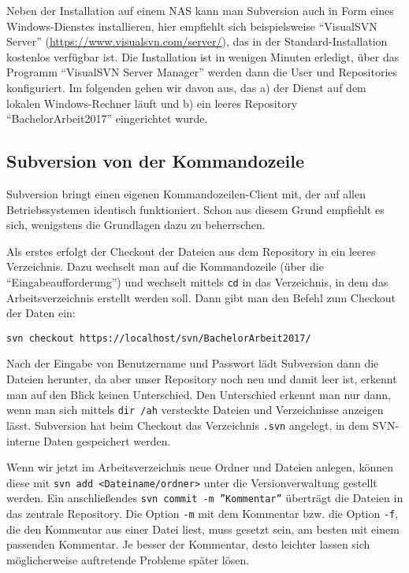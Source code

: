 Neben der Installation auf einem NAS kann man Subversion auch in Form eines Windows-Dienstes installieren, hier empfiehlt sich beispielsweise \enquote{VisualSVN Server} (\url{https://www.visualsvn.com/server/}), das in der Standard-Installation kostenlos verfügbar ist. Die Installation ist in wenigen Minuten erledigt, über das Programm \enquote{VisualSVN Server Manager} werden dann die User und Repositories konfiguriert. Im folgenden gehen wir davon aus, das a) der Dienst auf dem lokalen Windows-Rechner läuft und b) ein leeres Repository \enquote{BachelorArbeit2017} eingerichtet wurde.


\subsection{Subversion von der Kommandozeile}

Subversion bringt einen eigenen Kommandozeilen-Client mit, der auf allen Betriebssystemen identisch funktioniert. 
Schon aus diesem Grund empfiehlt es sich, wenigstens die Grundlagen dazu zu beherrschen.

Als erstes erfolgt der Checkout der Dateien aus dem Repository in ein leeres Verzeichnis. Dazu wechselt man auf die Kommandozeile (über die \enquote{Eingabeaufforderung}) und wechselt mittels \texttt{cd} in das Verzeichnis, in dem das Arbeitsverzeichnis erstellt werden soll. 
Dann gibt man den Befehl zum Checkout der Daten ein:

\texttt{svn checkout https://localhost/svn/BachelorArbeit2017/}

Nach der Eingabe von Benutzername und Passwort lädt Subversion dann die Dateien herunter, da aber unser Repository noch neu und damit leer ist, erkennt man auf den Blick keinen Unterschied. 
Den Unterschied erkennt man nur dann, wenn man sich mittels \texttt{dir /ah} versteckte Dateien und Verzeichnisse anzeigen lässt. 
Subversion hat beim Checkout das Verzeichnis \texttt{.svn} angelegt, in dem SVN-interne Daten gespeichert werden. 

Wenn wir jetzt im Arbeitsverzeichnis neue Ordner und Dateien anlegen, können diese mit \texttt{svn add <Dateiname/ordner>} unter die Versionverwaltung gestellt werden. 
Ein anschließendes \texttt{svn commit -m ''Kommentar''} überträgt die Dateien in das zentrale Repository. 
Die Option \texttt{-m} mit dem Kommentar bzw. die Option \texttt{-f}, die den Kommentar aus einer Datei liest, muss gesetzt sein, am besten mit einem passenden Kommentar. Je besser der Kommentar, desto leichter lassen sich möglicherweise auftretende Probleme später lösen.

